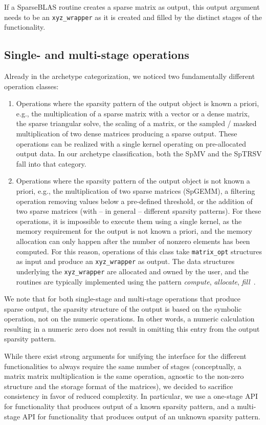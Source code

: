 \documentclass[manuscript,review]{acmart}
\begin{document}
If a SparseBLAS routine creates a sparse matrix as output, this output argument needs to be an \texttt{xyz\_wrapper} as it is created and filled by the distinct stages of the functionality.

\subsection{Single- and multi-stage operations}
\label{sec:sparseblasimpl}
Already in the archetype categorization, we noticed two fundamentally different operation classes:
\begin{enumerate}
    \item Operations where the sparsity pattern of the output object is known a priori, e.g., the multiplication of a sparse matrix with a vector or a dense matrix, the sparse triangular solve, the scaling of a matrix, or the sampled / masked multiplication of two dense matrices producing a sparse output. These operations can be realized with a single kernel operating on pre-allocated output data. In our archetype classification, both the SpMV and the SpTRSV fall into that category.
    \item Operations where the sparsity pattern of the output object is not known a priori, e.g., the multiplication of two sparse matrices (SpGEMM), a filtering operation removing values below a pre-defined threshold, or the addition of two sparse matrices (with -- in general -- different sparsity patterns).
    For these operations, it is impossible to execute them using a single kernel, as the memory requirement for the output is not known a priori, and the memory allocation can only happen after the number of nonzero elements has been computed. For this reason, operations of this class take \texttt{matrix\_opt} structures as input and produce an \texttt{xyz\_wrapper} as output. The data structures underlying the \texttt{xyz\_wrapper} are allocated and owned by the user, and the routines are typically implemented using the pattern \textit{compute}, \textit{allocate}, \textit{fill}~\cite{10.1145/275323.275327}.
\end{enumerate}

We note that for both single-stage and multi-stage operations that produce sparse output, the sparsity structure of the output is based on the symbolic operation, not on the numeric operations. In other words, a numeric calculation resulting in a numeric zero does not result in omitting this entry from the output sparsity pattern.


While there exist strong arguments for unifying the interface for the different functionalities to always require the same number of stages (conceptually, a matrix matrix multiplication is the same operation, agnostic to the non-zero structure and the storage format of the matrices), we decided to sacrifice consistency in favor of reduced complexity. In particular, we use a one-stage API for functionality that produces output of a known sparsity pattern, and a multi-stage API for functionality that produces output of an unknown sparsity pattern. 
\end{document}
